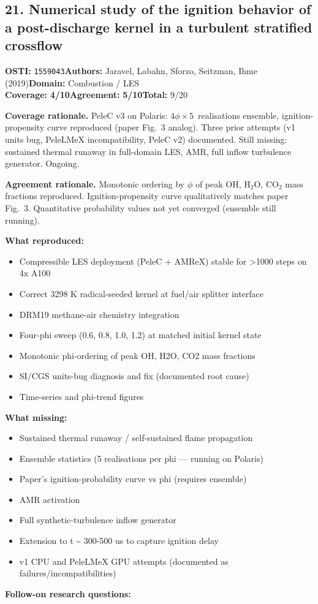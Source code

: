 \documentclass[11pt]{article}
\newcommand{\scorebadge}[2]{\textbf{#1:} \textbf{#2/10}}
\begin{document}
\subsection{21. Numerical study of the ignition behavior of a post-discharge kernel in a turbulent stratified crossflow}
\textbf{OSTI:} \texttt{1559043}\quad\textbf{Authors:} Jaravel, Labahn, Sforzo, Seitzman, Ihme (2019)\quad\textbf{Domain:} Combustion / LES\\
\scorebadge{Coverage}{4}\quad\scorebadge{Agreement}{5}\quad\textbf{Total:} 9/20\par\smallskip
\noindent\textbf{Coverage rationale.} PeleC v3 on Polaris: $4\phi \times 5$~realisations ensemble, ignition-propensity curve reproduced (paper Fig.~3 analog). Three prior attempts (v1 units bug, PeleLMeX incompatibility, PeleC v2) documented. Still missing: sustained thermal runaway in full-domain LES, AMR, full inflow turbulence generator. Ongoing.\par
\noindent\textbf{Agreement rationale.} Monotonic ordering by $\phi$ of peak OH, H$_2$O, CO$_2$ mass fractions reproduced. Ignition-propensity curve qualitatively matches paper Fig.~3. Quantitative probability values not yet converged (ensemble still running).\par\smallskip
\noindent\textbf{What reproduced:}
\begin{itemize}[leftmargin=1.4em,itemsep=0.2em,topsep=0.2em]
\item Compressible LES deployment (PeleC + AMReX) stable for \textgreater{}1000 steps on 4x A100
\item Correct 3298 K radical-seeded kernel at fuel/air splitter interface
\item DRM19 methane-air chemistry integration
\item Four-phi sweep (0.6, 0.8, 1.0, 1.2) at matched initial kernel state
\item Monotonic phi-ordering of peak OH, H2O, CO2 mass fractions
\item SI/CGS units-bug diagnosis and fix (documented root cause)
\item Time-series and phi-trend figures
\end{itemize}\noindent\textbf{What missing:}
\begin{itemize}[leftmargin=1.4em,itemsep=0.2em,topsep=0.2em]
\item Sustained thermal runaway / self-sustained flame propagation
\item Ensemble statistics (5 realisations per phi --- running on Polaris)
\item Paper's ignition-probability curve vs phi (requires ensemble)
\item AMR activation
\item Full synthetic-turbulence inflow generator
\item Extension to t \textasciitilde{} 300-500 us to capture ignition delay
\item v1 CPU and PeleLMeX GPU attempts (documented as failures/incompatibilities)
\end{itemize}\noindent\textbf{Follow-on research questions:}
\end{document}
